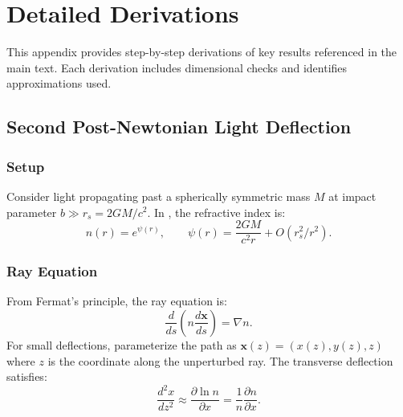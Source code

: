 
\section{Detailed Derivations}\label{app:derivations}

This appendix provides step-by-step derivations of key results referenced 
in the main text. Each derivation includes dimensional checks and 
identifies approximations used.

\subsection{Second Post-Newtonian Light Deflection}\label{app:deflection}

\subsubsection{Setup}

Consider light propagating past a spherically symmetric mass $M$ at impact 
parameter $b \gg r_s = 2GM/c^2$. In \DFD, the refractive index is:
\begin{equation}
n(r) = e^{\psi(r)}, \qquad \psi(r) = \frac{2GM}{c^2 r} + O(r_s^2/r^2).
\label{eq:psi_expansion}
\end{equation}

\subsubsection{Ray Equation}

From Fermat's principle, the ray equation is:
\begin{equation}
\frac{d}{ds}\left(n\frac{d\mathbf{x}}{ds}\right) = \nabla n.
\end{equation}
For small deflections, parameterize the path as $\mathbf{x}(z) = (x(z), y(z), z)$ 
where $z$ is the coordinate along the unperturbed ray. The transverse 
deflection satisfies:
\begin{equation}
\frac{d^2 x}{dz^2} \approx \frac{\partial \ln n}{\partial x} = \frac{1}{n}\frac{\partial n}{\partial x}.
\end{equation}


